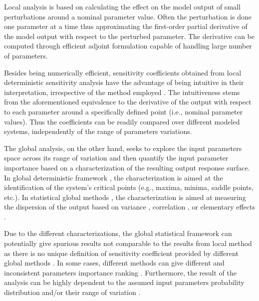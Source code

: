 Local analysis is based on calculating the effect on the model output of small perturbations around a nominal parameter value. 
Often the perturbation is done one parameter at a time thus approximating the first-order partial derivative of the model output with respect to the perturbed parameter. 
The derivative can be computed through efficient adjoint formulation \cite{Cacuci2003,Cacuci2010} capable of handling large number of parameters.

Besides being numerically efficient, sensitivity coefficients obtained from local deterministic sensitivity analysis have the advantage of being intuitive in their interpretation, irrespective of the method employed \cite{Razavi2015}.
The intuitiveness stems from the aforementioned equivalence to the derivative of the output with respect to each parameter \cite{Ionescu-Bujor2004} around a specifically defined point (i.e., nominal parameter values). 
Thus the coefficients can be readily compared over different modeled systems, independently of the range of parameters variations.

The global analysis, on the other hand, 
seeks to explore the input parameters space across its range of variation and then quantify the input parameter importance based on a characterization of the resulting output response surface. 
In global deterministic framework \cite{Ionescu-Bujor2004,Cacuci2010}, the characterization is aimed at the identification of the system’s critical points (e.g., maxima, minima, saddle points, etc.). 
In statistical global methods \cite{Saltelli2008, Saltelli2004, Saltelli2006}, the characterization is aimed at measuring the dispersion of the output based on variance \cite{Sobol2001,Cukier1978}, correlation \cite{Helton1993}, or elementary effects \cite{Morris1991}.

Due to the different characterizations, the global statistical framework can potentially give spurious results not comparable to the results from local method as there is no unique definition of sensitivity coefficient provided by different global methods \cite{Razavi2015}. 
In some cases, different methods can give different and inconsistent parameters importance ranking \cite{Saltelli2008,Saltelli2004}.
Furthermore, the result of the analysis can be highly dependent to the assumed input parameters probability distribution and/or their range of variation \cite{Cacuci2004,Cacuci2010}.

